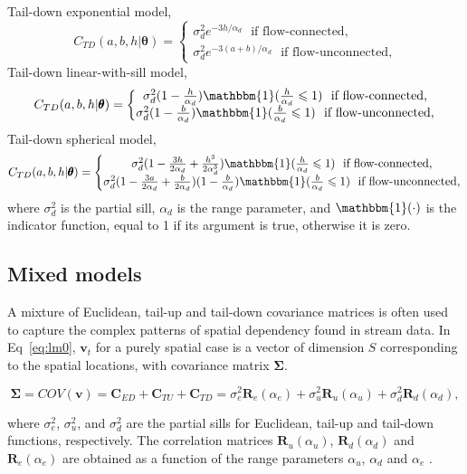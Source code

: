 Tail-down exponential model,
%
$$C_{TD}(a,b, h|\pmb{\theta}) = \left\{\begin{matrix}
\sigma_d^2 e^{-3h/\alpha_d} \:\:\: \textrm{if flow-connected,} \\
\sigma_d^2 e^{-3(a+b)/\alpha_d} \:\:\: \textrm{if flow-unconnected,} \end{matrix}\right. $$
%
Tail-down linear-with-sill model,
%
$$C_{TD}(a,b, h|\pmb{\theta}) = \left\{\begin{matrix}
\sigma_d^2 (1-\frac{h}{\alpha_d})\mathbbm{1}(\frac{h}{\alpha_d} \leqslant 1) \:\:\: \textrm{if flow-connected,} \\
\sigma_d^2 (1-\frac{b}{\alpha_d})\mathbbm{1}(\frac{b}{\alpha_d} \leqslant 1) \:\:\: \textrm{if flow-unconnected,} \end{matrix}\right. $$
%
Tail-down spherical model,
%
$$C_{TD}(a,b, h|\pmb{\theta}) = \left\{\begin{matrix}
\sigma_d^2 (1-\frac{3h}{2\alpha_d} + \frac{h^3}{2\alpha_d^3})\mathbbm{1}(\frac{h}{\alpha_d} \leqslant 1) \:\:\: \textrm{if flow-connected,}\\
\sigma_d^2 (1-\frac{3a}{2\alpha_d} + \frac{b}{2\alpha_d})(1-\frac{b}{\alpha_d})\mathbbm{1}(\frac{b}{\alpha_d} \leqslant 1) \:\:\: \textrm{if flow-unconnected,} \end{matrix}\right. $$
%
where $\sigma_d^2$ is the partial sill, $\alpha_d$ is the range parameter, and $\mathbbm{1}(\cdot)$ is the indicator function, equal to 1 if its argument is true, otherwise it is zero.

\subsection{Mixed models}
A mixture of Euclidean, tail-up and tail-down covariance matrices is often used to capture the complex patterns of spatial dependency found in stream data. In Eq~\ref{eq:lm0}, $\pmb{v}_t$ for a purely spatial case is a vector of dimension $S$ corresponding to the spatial locations, with covariance matrix $\pmb{\Sigma}$.


\begin{equation}
\pmb{\Sigma} = COV(\pmb{v}) = \pmb{C}_{ED} + \pmb{C}_{TU} + \pmb{C}_{TD}   
= \sigma_e^2\pmb{R}_{e}(\alpha_e)+\sigma_u^2\pmb{R}_{u}(\alpha_u) + \sigma_d^2\pmb{R}_{d}(\alpha_d), %
\label{eq:covs}
\end{equation}



\noindent where $\sigma^2_{e}$, $\sigma^2_{u}$, and $\sigma^2_{d}$ are the partial sills for Euclidean, tail-up and tail-down functions, respectively. The correlation matrices $\pmb{R}_{u}(\alpha_u)$, $\pmb{R}_{d}(\alpha_d)$ and $\pmb{R}_{e}(\alpha_e)$ are obtained as a function of the range parameters $\alpha_u$, $\alpha_d$ and $\alpha_e$ \citep{hoef2014ssn}.

